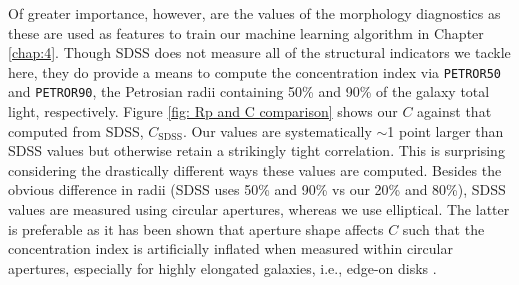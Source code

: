 Of greater importance, however, are the values of the morphology diagnostics as these are used as features to train our machine learning algorithm in Chapter \ref{chap:4}. Though SDSS does not measure all of the structural indicators we tackle here, they do provide a means to compute the concentration index via \texttt{PETROR50} and \texttt{PETROR90}, the Petrosian radii containing 50\% and 90\% of the galaxy total light, respectively. Figure \ref{fig: Rp and C comparison} shows our $C$ against that computed from SDSS, $C_{\mathrm{SDSS}}$. Our values are systematically $\sim$1 point larger than SDSS values but otherwise retain a strikingly tight correlation. This is surprising considering the drastically different ways these values are computed. Besides the obvious difference in radii (SDSS uses 50\% and 90\% vs our 20\% and 80\%), SDSS values are measured using circular apertures, whereas we use elliptical. The latter is preferable as it has been shown that aperture shape affects $C$ such that the concentration index is artificially inflated when measured within circular apertures, especially for highly elongated galaxies, i.e., edge-on disks \citep{Bershady2000, Andrae2011}.



